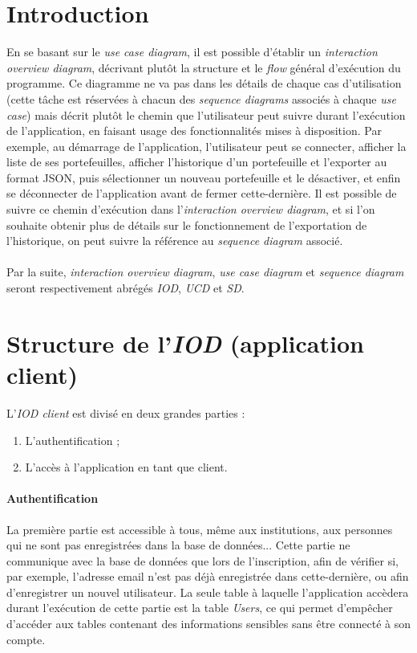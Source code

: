 \documentclass{article}
\begin{document}
\section{Introduction}
En se basant sur le \emph{use case diagram}, il est possible d'établir un \emph{interaction overview diagram}, décrivant plutôt la structure et le \emph{flow} général d'exécution du programme. Ce diagramme ne va pas dans les détails de chaque cas d'utilisation (cette tâche est réservées à chacun des \emph{sequence diagrams} associés à chaque \emph{use case}) mais décrit plutôt le chemin que l'utilisateur peut suivre durant l'exécution de l'application, en faisant usage des fonctionnalités mises à disposition. Par exemple, au démarrage de l'application, l'utilisateur peut se connecter, afficher la liste de ses portefeuilles, afficher l'historique d'un portefeuille et l'exporter au format JSON, puis sélectionner un nouveau portefeuille et le désactiver, et enfin se déconnecter de l'application avant de fermer cette-dernière. Il est possible de suivre ce chemin d'exécution dans l'\emph{interaction overview diagram}, et si l'on souhaite obtenir plus de détails sur le fonctionnement de l'exportation de l'historique, on peut suivre la référence au \emph{sequence diagram} associé.
\\
\\
\indent Par la suite, \emph{interaction overview diagram}, \emph{use case diagram} et \emph{sequence diagram} seront respectivement abrégés \emph{IOD}, \emph{UCD} et \emph{SD}.


\section{Structure de l'\emph{IOD} (application client)}
\noindent
L'\emph{IOD client} est divisé en deux grandes parties :
\begin{enumerate}
\item L'authentification ;
\item L'accès à l'application en tant que client.
\end{enumerate}
\paragraph{Authentification} La première partie est accessible à tous, même aux institutions, aux personnes qui ne sont pas enregistrées dans la base de données... Cette partie ne communique avec la base de données que lors de l'inscription, afin de vérifier si, par exemple, l'adresse email n'est pas déjà enregistrée dans cette-dernière, ou afin d'enregistrer un nouvel utilisateur. La seule table à laquelle l'application accèdera durant l'exécution de cette partie est la table \emph{Users}, ce qui permet d'empêcher d'accéder aux tables contenant des informations sensibles sans être connecté à son compte.
\end{document}
